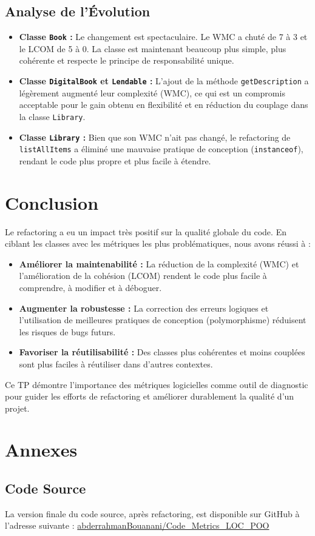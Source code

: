 \documentclass[11pt, a4paper]{article}
\begin{document}
\subsection{Analyse de l'Évolution}
\begin{itemize}
    \item \textbf{Classe \texttt{Book} :} Le changement est spectaculaire. Le WMC a chuté de 7 à 3 et le LCOM de 5 à 0. La classe est maintenant beaucoup plus simple, plus cohérente et respecte le principe de responsabilité unique.
    \item \textbf{Classe \texttt{DigitalBook} et \texttt{Lendable} :} L'ajout de la méthode \texttt{getDescription} a légèrement augmenté leur complexité (WMC), ce qui est un compromis acceptable pour le gain obtenu en flexibilité et en réduction du couplage dans la classe \texttt{Library}.
    \item \textbf{Classe \texttt{Library} :} Bien que son WMC n'ait pas changé, le refactoring de \texttt{listAllItems} a éliminé une mauvaise pratique de conception (\texttt{instanceof}), rendant le code plus propre et plus facile à étendre.
\end{itemize}

\section{Conclusion}
Le refactoring a eu un impact très positif sur la qualité globale du code. En ciblant les classes avec les métriques les plus problématiques, nous avons réussi à :
\begin{itemize}
    \item \textbf{Améliorer la maintenabilité :} La réduction de la complexité (WMC) et l'amélioration de la cohésion (LCOM) rendent le code plus facile à comprendre, à modifier et à déboguer.
    \item \textbf{Augmenter la robustesse :} La correction des erreurs logiques et l'utilisation de meilleures pratiques de conception (polymorphisme) réduisent les risques de bugs futurs.
    \item \textbf{Favoriser la réutilisabilité :} Des classes plus cohérentes et moins couplées sont plus faciles à réutiliser dans d'autres contextes.
\end{itemize}
Ce TP démontre l'importance des métriques logicielles comme outil de diagnostic pour guider les efforts de refactoring et améliorer durablement la qualité d'un projet.

\section*{Annexes}
\subsection*{Code Source}
La version finale du code source, après refactoring, est disponible sur GitHub à l'adresse suivante :
\href{https://github.com/abderrahmanBouanani/Code_Metrics_LOC_POO}{abderrahmanBouanani/Code\_Metrics\_LOC\_POO}
\end{document}
